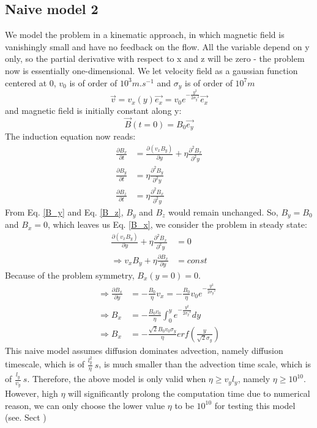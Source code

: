 \documentclass[11pt]{article}
\begin{document}
\subsection{Naive model 2 } \label{NaiveModel}
We model the problem in a kinematic approach, in which magnetic field is vanishingly small and have no feedback on the flow. All the variable depend on y only, so the partial derivative with respect to x and z will be zero - the problem now is essentially one-dimensional. We let velocity field as a gaussian function centered at 0, $v_0$ is of order of  $10^3 m.s^{-1}$ and $\sigma_y$ is of order of $10^7 m$
$$ \overrightarrow{v} = v_x(y)\overrightarrow{e_x} = v_0 e^{-\frac{y^2}{2{\sigma_y}^2}}\overrightarrow{e_x} $$ and  magnetic field is initially constant along y:   
$$\overrightarrow{B}(t=0) = B_0 \overrightarrow{e_y}$$ 
The induction equation now reads:
\begin{align}
  \frac{\partial B_x}{\partial t} &= \frac{\partial(v_x B_y)}{\partial y} + \eta{\frac{\partial^2 B_x}{\partial^2 y}} \label{B_x}\\ 
\frac{\partial B_y}{\partial t}  &=    \eta{\frac{\partial^2 B_y}{\partial^2 y}} \label{B_y} \\
\frac{\partial B_z}{\partial t}  &=  \eta{\frac{\partial^2 B_x}{\partial^2 y}} \label{B_z}
\end{align}
From Eq. \ref{B_y} and Eq. \ref{B_z}, $B_y$ and $B_z$ would remain unchanged. So, $B_y = B_0$ and $B_x = 0$, which leaves us Eq. \ref{B_x}, we consider the problem in steady state:
\begin{align}
\frac{\partial(v_x B_y)}{\partial y} + \eta{\frac{\partial^2 B_x}{\partial^2 y}} &= 0 \\
\Longrightarrow v_x B_y + \eta{\frac{\partial B_x}{\partial y}} &= const
\end{align}
Because of the problem symmetry, $B_x(y=0) = 0$.
\begin{align}
\Longrightarrow \frac{\partial B_x}{\partial y} &= -\frac{B_0}{\eta} v_x  = -\frac{B_0}{\eta}v_0 e^{-\frac{y^2}{2{\sigma_y}^2}} \\
\Longrightarrow B_x &= -\frac{B_0 v_0}{\eta} \int_0^y e^{-\frac{y^2}{2{\sigma_y}^2}} dy \\
\Longrightarrow B_x &= -\frac{\sqrt{2} B_0 v_0 \sigma_y}{\eta} erf(\frac{y}{\sqrt{2}\sigma_y})
\end{align}
This naive model assumes diffusion dominates advection, namely diffusion timescale, which is of $\frac{l_y^2}{\eta} \ s$,  is much smaller than the advection time scale, which is of $\frac{l_y}{v_y} \ s$. Therefore, the above model is only valid when $\eta \geq v_y l_y$, namely $\eta \geq 10^{10}$. However, high $\eta$ will significantly prolong the computation time due to numerical reason, we can only choose the lower value $\eta$ to be $10^{10}$ for testing this model (see. Sect )    
\end{document}
